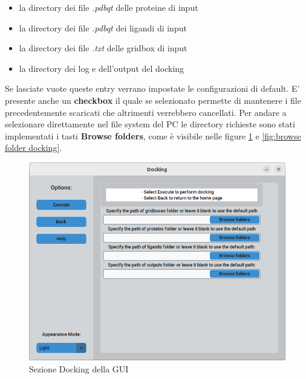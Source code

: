 \begin{itemize}
    \item la directory dei file \textit{.pdbqt} delle proteine di input
    \item la directory dei file \textit{.pdbqt} dei ligandi di input
    \item la directory dei file \textit{.txt} delle gridbox di input
    \item la directory dei log e dell'output del docking
\end{itemize}

Se lasciate vuote queste entry verrano impostate le configurazioni di default. E' presente anche un \textbf{checkbox} il quale se selezionato permette di mantenere i file precedentemente scaricati che altrimenti verrebbero cancellati.\newline
Per andare a selezionare direttamente nel file system del PC le directory richieste sono stati implementati i tasti \textbf{Browse folders}, come è visibile nelle figure \ref{fig:docking} e \ref{fig:browse folder docking}.

\begin{figure}[H]
    \centering
    \includegraphics[scale=0.6]{immagini/capitolo3/docking.png}
    \caption{Sezione Docking della GUI}
    \label{fig:docking}
\end{figure}

